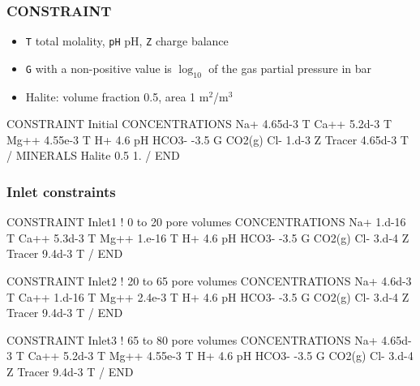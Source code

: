 \documentclass{beamer}
\begin{document}
\begin{frame}\frametitle{CONSTRAINT}

\begin{itemize}
  \item \texttt{T} total molality, \texttt{pH} pH, \texttt{Z} charge balance
  \item \texttt{G} with a non-positive value is $\log_{10}$ of the gas partial pressure in bar
  \item Halite: volume fraction 0.5, area 1 m$^2$/m$^3$
\end{itemize}

\scriptsize
\begin{semiverbatim}
CONSTRAINT Initial
  CONCENTRATIONS
    Na+     4.65d-3  T
    Ca++    5.2d-3   T
    Mg++    4.55e-3  T
    H+      4.6      pH
    HCO3-  -3.5      G   CO2(g)
    Cl-     1.d-3    Z
    Tracer  4.65d-3  T
  /
  MINERALS
    Halite  0.5 1.
  /
END
\end{semiverbatim}

\end{frame}

\begin{frame}\frametitle{Inlet constraints}

\scriptsize
\begin{semiverbatim}
CONSTRAINT Inlet1          ! 0 to 20 pore volumes
  CONCENTRATIONS
    Na+     1.d-16  T
    Ca++    5.3d-3  T
    Mg++    1.e-16  T
    H+      4.6     pH
    HCO3-  -3.5     G   CO2(g)
    Cl-     3.d-4   Z
    Tracer  9.4d-3  T
  /
END

CONSTRAINT Inlet2          ! 20 to 65 pore volumes
  CONCENTRATIONS
    Na+     4.6d-3  T
    Ca++    1.d-16  T
    Mg++    2.4e-3  T
    H+      4.6     pH
    HCO3-  -3.5     G   CO2(g)
    Cl-     3.d-4   Z
    Tracer  9.4d-3  T
  /
END

CONSTRAINT Inlet3          ! 65 to 80 pore volumes
  CONCENTRATIONS
    Na+     4.65d-3 T
    Ca++    5.2d-3  T
    Mg++    4.55e-3 T
    H+      4.6     pH
    HCO3-  -3.5     G   CO2(g)
    Cl-     3.d-4   Z
    Tracer  9.4d-3  T
  /
END
\end{semiverbatim}

\end{frame}
\end{document}
